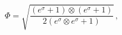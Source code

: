 \begin{equation}\label{boro20older}
\Phi=\sqrt{\frac{(e^\sigma+1)\otimes(e^\sigma+1)}
{2(e^\sigma\!\otimes e^\sigma+1)}}\,,
\end{equation}

